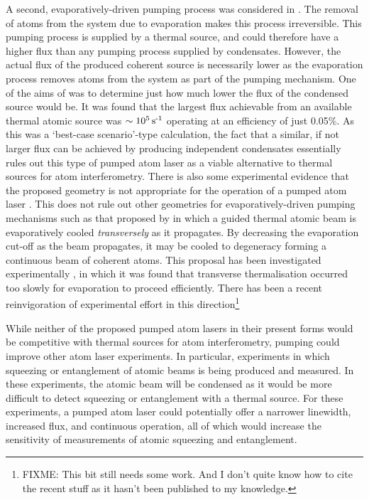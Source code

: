 A second, evaporatively-driven pumping process was considered in .  The removal of atoms from the system due to evaporation makes this process irreversible.  This pumping process is supplied by a thermal source, and could therefore have a higher flux than any pumping process supplied by condensates.  However, the actual flux of the produced coherent source is necessarily lower as the evaporation process removes atoms from the system as part of the pumping mechanism.  One of the aims of  was to determine just how much lower the flux of the condensed source would be.  It was found that the largest flux achievable from an available thermal atomic source was $\sim\unit[10^5]{s\textsuperscript{-1}}$ operating at an efficiency of just 0.05\%.  As this was a `best-case scenario'-type calculation, the fact that a similar, if not larger flux can be achieved by producing independent condensates essentially rules out this type of pumped atom laser as a viable alternative to thermal sources for atom interferometry.  There is also some experimental evidence that the proposed geometry is not appropriate for the operation of a pumped atom laser \citep{Robins:2008}.  This does not rule out other geometries for evaporatively-driven pumping mechanisms such as that proposed by \citet{Mandonnet:2000lr} in which a guided thermal atomic beam is evaporatively cooled \emph{transversely} as it propagates.  By decreasing the evaporation cut-off as the beam propagates, it may be cooled to degeneracy forming a continuous beam of coherent atoms.  This proposal has been investigated experimentally \citep{Cren:2002rt,Roos:2003vn,Roos:2003,Lahaye:2004,Vogels:2004,Lahaye:2005uq}, in which it was found that transverse thermalisation occurred too slowly for evaporation to proceed efficiently.  There has been a recent reinvigoration of experimental effort in this direction\footnote{FIXME: This bit still needs some work.  And I don't quite know how to cite the recent stuff as it hasn't been published to my knowledge.}

While neither of the proposed pumped atom lasers in their present forms would be competitive with thermal sources for atom interferometry, pumping could improve other atom laser experiments.  In particular, experiments in which squeezing or entanglement of atomic beams is being produced and measured.  In these experiments, the atomic beam will be condensed as it would be more difficult to detect squeezing or entanglement with a thermal source.  For these experiments, a pumped atom laser could potentially offer a narrower linewidth, increased flux, and continuous operation, all of which would increase the sensitivity of measurements of atomic squeezing and entanglement.

